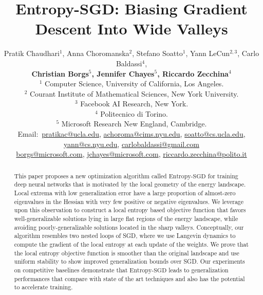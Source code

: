 \documentclass[10pt]{article}
\title{Entropy-SGD: Biasing Gradient Descent Into Wide Valleys}
\author{Pratik Chaudhari$^{1}$, Anna Choromanska$^{2}$, Stefano Soatto$^{1}$, Yann LeCun$^{2,3}$, Carlo Baldassi$^{4}$,\\[0.03in]
\textbf{Christian Borgs$^{5}$, Jennifer Chayes$^{5}$, 
Riccardo Zecchina$^{4}$}\\[0.05in]
$^{1}$ Computer Science, University of California, Los Angeles.\\
$^{2}$ Courant Institute of Mathematical Sciences, New York University.\\
$^{3}$ Facebook AI Research, New York.\\
$^{4}$ Politecnico di Torino.\\
$^{5}$ Microsoft Research New England, Cambridge.\\ [0.05in]
{\footnotesize
Email:\ \href{mailto:pratikac@ucla.edu}{pratikac@ucla.edu},
\href{mailto:achoroma@cims.nyu.edu}{achoroma@cims.nyu.edu},
\href{mailto:soatto@cs.ucla.edu}{soatto@cs.ucla.edu},
\href{mailto:yann@cs.nyu.edu}{yann@cs.nyu.edu},
\href{mailto:carlobaldassi@gmail.com}{carlobaldassi@gmail.com}}\\[0.03in]
{\footnotesize
\hspace{0.33in} \href{mailto:borgs@microsoft.com}{borgs@microsoft.com},
\href{mailto:jchayes@microsoft.com}{jchayes@microsoft.com},
\href{mailto:riccardo.zecchina@polito.it}{riccardo.zecchina@polito.it}
}}
\newcommand{\entropysgd}{\mathrm{Entropy}\textrm{-}\mathrm{SGD}}
\begin{document}
\maketitle

\begin{abstract}
This paper proposes a new optimization algorithm called $\entropysgd$ for training deep neural networks that is motivated by the local geometry of the energy landscape. Local extrema with low generalization error have a large proportion of almost-zero eigenvalues in the Hessian with very few positive or negative eigenvalues. We leverage upon this observation to construct a local entropy based objective function that favors well-generalizable solutions lying in large flat regions of the energy landscape, while avoiding poorly-generalizable solutions located in the sharp valleys. Conceptually, our algorithm resembles two nested loops of SGD, where we use Langevin dynamics to compute the gradient of the local entropy at each update of the weights. We prove that the local entropy objective function is smoother than the original landscape and use uniform stability to show improved generalization bounds over SGD. Our experiments on competitive baselines demonstrate that $\entropysgd$ leads to generalization performances that compare with state of the art techniques and also has the potential to accelerate training.
\end{abstract}
\end{document}
